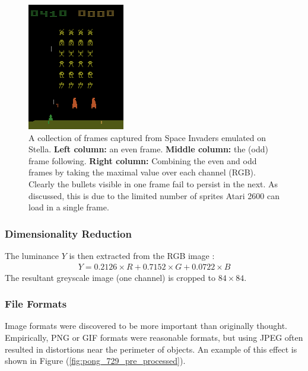 \begin{figure}
\begin{multicols}{3}
    \includegraphics[scale=0.8]{figures/related_work/space_invaders_1044_rgb_maximum_of_even_odd.png}\par
\end{multicols}
\caption{A collection of frames captured from Space Invaders emulated on Stella. \textbf{Left column:} an even frame. \textbf{Middle column:} the (odd) frame following. \textbf{Right column:} Combining the even and odd frames by taking the maximal value over each channel (RGB). Clearly the bullets visible in one frame fail to persist in the next. As discussed, this is due to the limited number of sprites Atari 2600 can load in a single frame.}
\label{fig:even_and_odd_frames_space_invaders}
\end{figure}

\subsubsection{Dimensionality Reduction}
The luminance $Y$ is then extracted from the RGB image \cite{Stokes1996}:
\begin{align}
Y = 0.2126\times R + 0.7152\times G + 0.0722\times B
\end{align}
The resultant greyscale image (one channel) is cropped to $84 \times 84$.

\subsubsection{File Formats}
Image formats were discovered to be more important than originally thought. Empirically, PNG or GIF formats were reasonable formats, but using JPEG often resulted in distortions near the perimeter of objects. An example of this effect is shown in Figure (\ref{fig:pong_729_pre_processed}).\\

